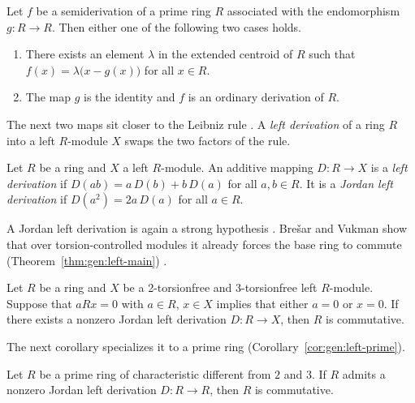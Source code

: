 \begin{theorem}\label{thm:gen:semi-structure}
Let $f$ be a semiderivation of a prime ring $R$ associated with the
endomorphism $g\colon R\to R$. Then either one of the following two cases
holds.
\begin{enumerate}[label=(\arabic*)]
\item There exists an element $\lambda$ in the extended centroid of $R$ such
that $f(x)=\lambda\bigl(x-g(x)\bigr)$ for all $x\in R$.
\item The map $g$ is the identity and $f$ is an ordinary derivation of $R$.
\end{enumerate}
\end{theorem}

The next two maps sit closer to the Leibniz rule
\cite[p.~7]{BresarVukman1990Left}. A \emph{left derivation} of a ring $R$ into
a left $R$-module $X$ swaps the two factors of the rule.

\begin{definition}\label{def:gen:left-derivation}
Let $R$ be a ring and $X$ a left $R$-module. An additive mapping
$D\colon R\to X$ is a \emph{left derivation} if
$D(ab)=a\,D(b)+b\,D(a)$ for all $a,b\in R$. It is a \emph{Jordan left
derivation} if $D(a^{2})=2a\,D(a)$ for all $a\in R$.
\end{definition}

A Jordan left derivation is again a strong hypothesis
\cite[p.~8]{BresarVukman1990Left}. Bre\v{s}ar and Vukman show that over
torsion-controlled modules it already forces the base ring to commute (Theorem~\ref{thm:gen:left-main})
\cite[p.~8]{BresarVukman1990Left}.\begin{theorem}\label{thm:gen:left-main}
Let $R$ be a ring and $X$ be a 2-torsionfree and 3-torsionfree left
$R$-module. Suppose that $aRx=0$ with $a\in R$, $x\in X$ implies that either
$a=0$ or $x=0$. If there exists a nonzero Jordan left derivation $D\colon
R\to X$, then $R$ is commutative.
\end{theorem}

The next corollary specializes it to a prime ring
(Corollary~\ref{cor:gen:left-prime}).

\begin{corollary}\label{cor:gen:left-prime}
Let $R$ be a prime ring of characteristic different from $2$ and $3$. If $R$
admits a nonzero Jordan left derivation $D\colon R\to R$, then $R$ is
commutative.
\end{corollary}

